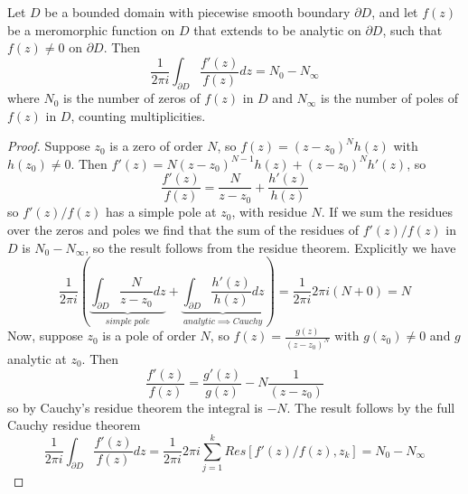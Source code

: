 \documentclass[12pt, a4paper, oneside, openright, titlepage]{book}
\begin{document}
\begin{thm}
    Let $D$ be a bounded domain with piecewise smooth boundary $\partial D$, and let $f(z)$ be a meromorphic function on $D$ that extends to be analytic on $\partial D$, such that $f(z) \neq 0$ on $\partial D$. Then \begin{equation*}
        \frac{1}{2\pi i}\int_{\partial D}\frac{f'(z)}{f(z)}dz = N_0 - N_{\infty}
    \end{equation*}
    where $N_0$ is the number of zeros of $f(z)$ in $D$ and $N_{\infty}$ is the number of poles of $f(z)$ in $D$, counting multiplicities.
\end{thm}
\begin{proof}
    Suppose $z_0$ is a zero of order $N$, so $f(z) = (z-z_0)^Nh(z)$ with $h(z_0) \neq 0$. Then $f'(z) = N(z-z_0)^{N-1}h(z)+(z-z_0)^Nh'(z)$, so \begin{equation*}
        \frac{f'(z)}{f(z)} = \frac{N}{z-z_0} + \frac{h'(z)}{h(z)}
    \end{equation*}
    so $f'(z)/f(z)$ has a simple pole at $z_0$, with residue $N$. If we sum the residues over the zeros and poles we find that the sum of the residues of $f'(z)/f(z)$ in $D$ is $N_0-N_{\infty}$, so the result follows from the residue theorem. Explicitly we have \begin{equation*}
        \frac{1}{2\pi i}\left(\underbrace{\int_{\partial D}\frac{N}{z-z_0}dz}_{simple\;pole} + \underbrace{\int_{\partial D}\frac{h'(z)}{h(z)}dz}_{analytic\implies Cauchy}\right) = \frac{1}{2\pi i}2\pi i(N+0) = N
    \end{equation*}
    Now, suppose $z_0$ is a pole of order $N$, so $f(z) = \frac{g(z)}{(z-z_0)^N}$ with $g(z_0) \neq 0$ and $g$ analytic at $z_0$. Then \begin{equation*}
        \frac{f'(z)}{f(z)} = \frac{g'(z)}{g(z)}-N\frac{1}{(z-z_0)}
    \end{equation*}
    so by Cauchy's residue theorem the integral is $-N$. The result follows by the full Cauchy residue theorem \begin{equation*}
        \frac{1}{2\pi i}\int_{\partial D}\frac{f'(z)}{f(z)}dz = \frac{1}{2\pi i}2\pi i\sum_{j=1}^kRes[f'(z)/f(z),z_k] = N_0 - N_{\infty}
    \end{equation*}
\end{proof}
\end{document}
